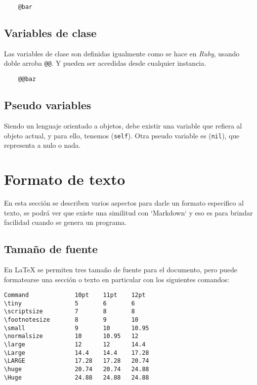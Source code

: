 \documentclass[12pt,letterpaper,titlepage,oneside,openright]{book}
\newcommand{\latex}{\LaTeX\xspace}
\newcommand{\ruby}{\textit{Ruby}\xspace}
\newcommand{\ttcode}[1]{(\texttt{#1})}
\begin{document}
\begin{center}
\begin{lstlisting}
    @bar
\end{lstlisting}
\end{center}

\subsection{Variables de clase}

Las variables de clase son definidas igualmente como se hace en \ruby, usando doble arroba \texttt{@@}. Y pueden ser accedidas desde cualquier instancia.

\begin{center}
\begin{lstlisting}
    @@baz
\end{lstlisting}
\end{center}

\subsection{Pseudo variables}

Siendo un lenguaje orientado a objetos, debe existir una variable que refiera al
objeto actual, y para ello, tenemos \ttcode{self}. Otra pseudo variable es \ttcode{nil}, que representa a nulo o nada.

\section{Formato de texto}

En esta sección se describen varios aspectos para darle un formato especifico al
texto, se podrá ver que existe una similitud con `Markdown` y eso es para
brindar facilidad cuando se genera un programa.

\subsection{Tamaño de fuente}

En \latex se permiten tres tamaño de fuente para el documento, pero puede formatearse una sección o texto en particular con los siguientes comandos:

\begin{verbatim}
Command             10pt    11pt    12pt
\tiny               5       6       6
\scriptsize         7       8       8
\footnotesize       8       9       10
\small              9       10      10.95
\normalsize         10      10.95   12
\large              12      12      14.4
\Large              14.4    14.4    17.28
\LARGE              17.28   17.28   20.74
\huge               20.74   20.74   24.88
\Huge               24.88   24.88   24.88
\end{verbatim}
\end{document}
